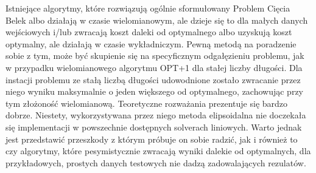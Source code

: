 \begin{streszczenie}
Istniejące algorytmy, które rozwiązują ogólnie sformułowany Problem Cięcia Belek albo działają w czasie wielomianowym, ale  dzieje się to dla małych danych wejściowych i/lub zwracają koszt daleki od optymalnego albo uzyskują koszt optymalny, ale działają w czasie wykładniczym. Pewną metodą na poradzenie sobie z tym, może być skupienie się na specyficznym odgałęzieniu problemu, jak w przypadku wielomianowego algorytmu OPT+1 dla stałej liczby długości. Dla instacji problemu ze stałą liczbą długości udowodnione zostało zwracanie przez niego wyniku maksymalnie o jeden większego od optymalnego, zachowując przy tym złożoność wielomianową\cite{ALG_OPT_1}. Teoretyczne rozważania prezentuje się bardzo dobrze. Niestety, wykorzystywana przez niego metoda elipsoidalna nie doczekała się implementacji w powszechnie dostępnych solverach liniowych. Warto jednak jest przedstawić przeszkody z którym próbuje on sobie radzić, jak i również to czy algorytmy, które pesymistycznie zwracają wyniki dalekie od optymalnych, dla przykładowych, prostych danych testowych nie dadzą zadowalających rezulatów.
\end{streszczenie}
